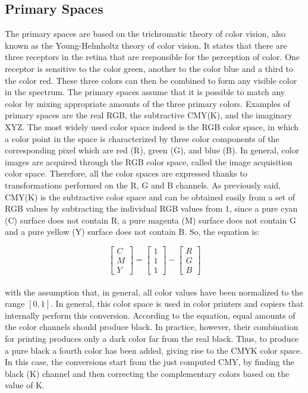 \documentclass[final,a4paper,12pt,english]{UnicaPhdThesis3}
\begin{document}
\subsection{Primary Spaces}  
The primary spaces are based on the trichromatic theory of color vision, also known as the Young-Helmholtz theory of color vision. It states that there are three receptors in the retina that are responsible for the perception of color. One receptor is sensitive to the color green, another to the color blue and a third to the color red. These three colors can then be combined to form any visible color in the spectrum.
The primary spaces assume that it is possible to match any color by mixing appropriate amounts of the three primary colors. Examples of primary spaces are the real RGB, the subtractive CMY(K), and the imaginary XYZ. The most widely used color space indeed is the RGB color space, in which a color point in the space is characterized by three color components of the corresponding pixel which are red (R), green (G), and blue (B). In general, color images are acquired through the RGB color space, called the image acquisition color space. Therefore, all the color spaces are expressed thanks to transformations performed on the R, G and B channels.
As previously said, CMY(K) is the subtractive color space and can be obtained easily from a set of RGB values by subtracting the individual RGB values from 1, since a pure cyan (C) surface does not contain R, a pure magenta (M) surface does not contain G and a pure yellow (Y) surface does not contain B. So, the equation is:

\begin{equation}
\left [ { \begin{array}{c} C  \\ M   \\ Y \end{array} } \right ] = 
\left [ { \begin{array}{c} 1   \\ 1   \\ 1 \end{array} } \right ]  - \left [ { \begin{array}{c} R  \\ G  \\ B     \end{array} } \right ] 
\end{equation}
\\
with the assumption that, in general, all color values have been normalized to the range $[0,1]$. In general, this color space is used in color printers and copiers that internally perform this conversion. According to the equation, equal amounts of the color channels should produce black. In practice, however, their combination for printing produces only a dark color far from the real black. Thus, to produce a pure black a fourth color has been added, giving rise to the CMYK color space. In this case, the conversions start from the just computed CMY, by finding the black (K) channel and then correcting the complementary colors based on the value of K.
\end{document}
